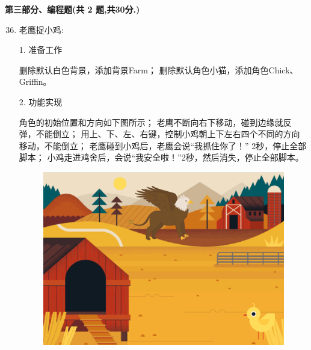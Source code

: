 \documentclass[10pt, a4paper]{article}
\begin{document}
    \newpage
    {\noindent \textbf{第三部分、编程题(共 2 题,共30分.)}}
    \begin{enumerate}
        \setcounter{enumi}{35}
        
        \item 老鹰捉小鸡:
        
        1. 准备工作
        \begin{tasks}[label = (\arabic*)]
            \task 删除默认白色背景，添加背景Farm；
            \task 删除默认角色小猫，添加角色Chick、Griffin。
        \end{tasks}
        2. 功能实现
        \begin{tasks}[label = (\arabic*)]
            \task 角色的初始位置和方向如下图所示；
            \task 老鹰不断向右下移动，碰到边缘就反弹，不能倒立；
            \task 用上、下、左、右键，控制小鸡朝上下左右四个不同的方向移动，不能倒立；
            \task 老鹰碰到小鸡后，老鹰会说“我抓住你了！” 2秒，停止全部脚本；
            \task 小鸡走进鸡舍后，会说“我安全啦！”2秒，然后消失，停止全部脚本。
        \end{tasks}
        \begin{figure}[htbp]
            \centering
            \begin{minipage}[t]{.3\textwidth}
                \centering
                \includegraphics[width=\textwidth]{figure/36-1.png}
            \end{minipage}
            \begin{minipage}[t]{.29\textwidth}
                \centering

\end{minipage}
\end{figure}
\end{enumerate}
\end{document}
